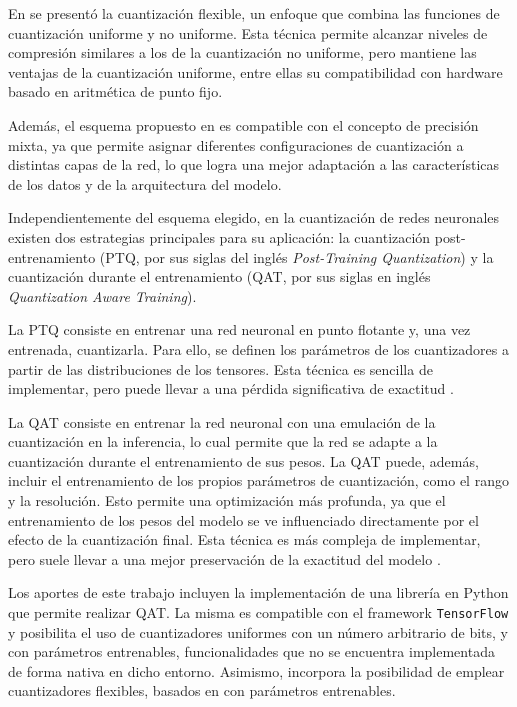 En \cite{electronics13101923} se presentó la cuantización flexible, un enfoque que combina las funciones de cuantización uniforme y no uniforme. Esta técnica permite alcanzar niveles de compresión similares a los de la cuantización no uniforme, pero mantiene las ventajas de la cuantización uniforme, entre ellas su compatibilidad con hardware basado en aritmética de punto fijo.

Además, el esquema propuesto en \cite{electronics13101923} es compatible con el concepto de precisión mixta, ya que permite asignar diferentes configuraciones de cuantización a distintas capas de la red, lo que logra una mejor adaptación a las características de los datos y de la arquitectura del modelo.

Independientemente del esquema elegido, en la cuantización de redes neuronales existen dos estrategias principales para su aplicación: la cuantización post-entrenamiento (PTQ, por sus siglas del inglés \textit{Post-Training Quantization}) y la cuantización durante el entrenamiento (QAT, por sus siglas en inglés \textit{Quantization Aware Training}).

La PTQ consiste en entrenar una red neuronal en punto flotante y, una vez entrenada, cuantizarla. Para ello, se definen los parámetros de los cuantizadores a partir de las distribuciones de los tensores. Esta técnica es sencilla de implementar, pero puede llevar a una pérdida significativa de exactitud \cite{Nagel2020}.

La QAT consiste en entrenar la red neuronal con una emulación de la cuantización en la inferencia, lo cual permite que la red se adapte a la cuantización durante el entrenamiento de sus pesos. La QAT puede, además, incluir el entrenamiento de los propios parámetros de cuantización, como el rango y la resolución. Esto permite una optimización más profunda, ya que el entrenamiento de los pesos del modelo se ve influenciado directamente por el efecto de la cuantización final. Esta técnica es más compleja de implementar, pero suele llevar a una mejor preservación de la exactitud del modelo \cite{Jacob2018}.

Los aportes de este trabajo incluyen la implementación de una librería en Python que permite realizar QAT. La misma es compatible con el framework \texttt{TensorFlow} \cite{tensorflow} y posibilita el uso de cuantizadores uniformes con un número arbitrario de bits, y con parámetros entrenables, funcionalidades que no se encuentra implementada de forma nativa en dicho entorno. Asimismo, incorpora la posibilidad de emplear cuantizadores flexibles, basados en \cite{electronics13101923} con parámetros entrenables.

